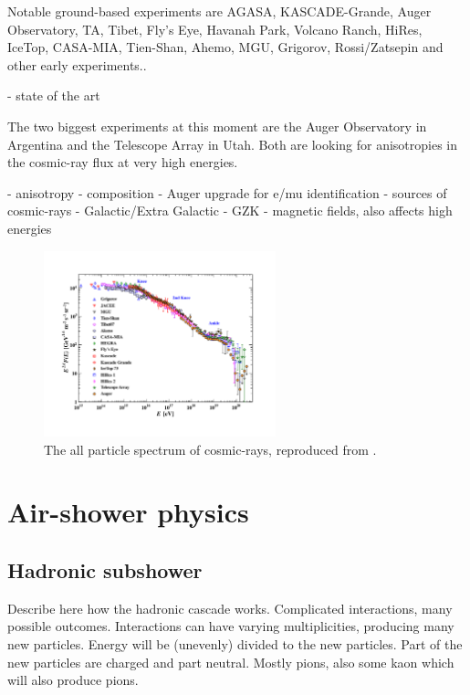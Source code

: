 Notable ground-based experiments are AGASA, KASCADE-Grande, Auger Observatory, TA, Tibet, Fly's Eye, Havanah Park, Volcano Ranch, HiRes, IceTop, CASA-MIA, Tien-Shan, Ahemo, MGU, Grigorov, Rossi/Zatsepin and other early experiments..

- state of the art

The two biggest experiments at this moment are the Auger Observatory in Argentina and the Telescope Array in Utah. Both are looking for anisotropies in the cosmic-ray flux at very high energies.

- anisotropy
- composition
- Auger upgrade for e/mu identification
- sources of cosmic-rays
- Galactic/Extra Galactic
- GZK
- magnetic fields, also affects high energies



\begin{figure}
    \centering
    \includegraphics[width=0.6\textwidth]
                    {plots/cosmic-rays/PDG_28_8_all_particle_spectrum}
    \caption{The all particle spectrum of cosmic-rays, reproduced from \cite{olive2014pdg}.}
    \label{fig:spectrum}
\end{figure}


\section{Air-shower physics}
\label{sec:air-shower-physics}

\subsection{Hadronic subshower}

Describe here how the hadronic cascade works. Complicated interactions, many possible outcomes. Interactions can have varying multiplicities, producing many new particles. Energy will be (unevenly) divided to the new particles. Part of the new particles are charged and part neutral. Mostly pions, also some kaon which will also produce pions.

